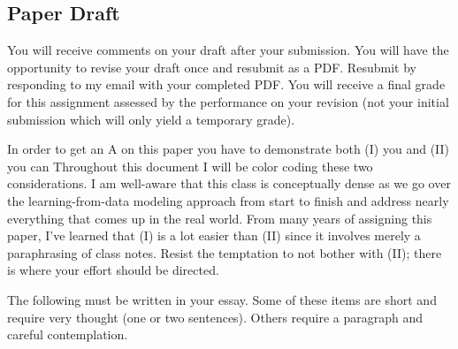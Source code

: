 \documentclass[12pt]{article}
\begin{document}
\subsection*{Paper Draft}

You will receive comments on your draft after your submission. You will have the opportunity to revise your draft once and resubmit as a PDF. Resubmit by responding to my email with your completed PDF. You will receive a final grade for this assignment assessed by the performance on your revision (not your initial submission which will only yield a temporary grade).

In order to get an A on this paper you have to demonstrate both (I) you  and (II) you can  Throughout this document I will be color coding these two considerations. I am well-aware that this class is conceptually dense as we go over the learning-from-data modeling approach from start to finish and address nearly everything that comes up in the real world. From many years of assigning this paper, I've learned that (I) is a lot easier than (II) since it involves merely a paraphrasing of class notes. Resist the temptation to not bother with (II); there is where your effort should be directed.

The following must be written in your essay. Some of these items are short and require very thought (one or two sentences). Others require a paragraph and careful contemplation.
\end{document}
